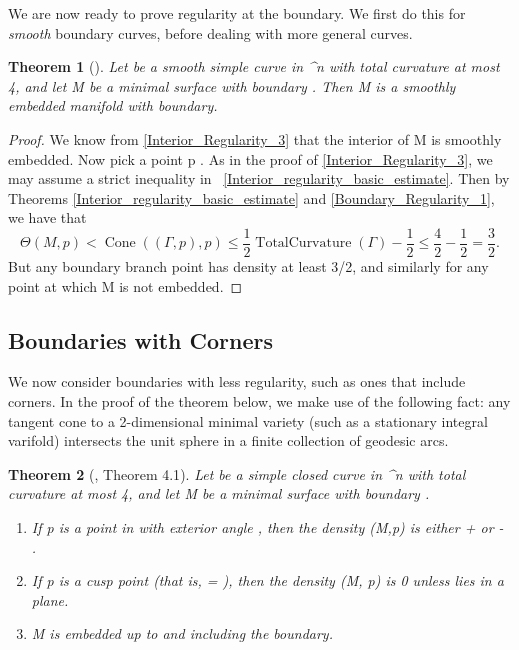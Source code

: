 \documentclass[a4paper, 11pt]{article}
\theoremstyle{plain}
\newtheorem{theorem}{Theorem}[section]
\theoremstyle{definition}
\theoremstyle{remark}
\numberwithin{equation}{subsection}
\def\({}
\def\){}
\def\pi{}
\begin{document}
We are now ready to prove regularity at the boundary. We first do this for \emph{smooth} boundary curves, before dealing with more general curves.

\begin{theorem}[{\cite[Theorem 3.2]{EWW02}}]
Let \(\Gamma\) be a smooth simple curve in \(^{n}\) with total curvature at most \(4\pi\), and let \(M\) be a minimal surface with boundary \(\Gamma\). Then \(M\) is a smoothly embedded manifold with boundary.
\end{theorem}

  
\begin{proof}
We know from \cref{Interior_Regularity_3} that the interior of \(M\) is smoothly embedded. Now pick a point \(p \in \Gamma\). As in the proof of  \cref{Interior_Regularity_3}, we may assume a strict inequality in \ \cref{Interior_regularity_basic_estimate}. Then by Theorems \ref{Interior_regularity_basic_estimate} and \ref{Boundary_Regularity_1}, we have that
\begin{equation}
\Theta(M,p) < \operatorname{Cone}((\Gamma, p), p) \leqslant \frac{1}{2\pi}\operatorname{TotalCurvature}(\Gamma) - \frac{1}{2} \leqslant \frac{4\pi}{2\pi} - \frac{1}{2} = \frac{3}{2}.
\end{equation}
But any boundary branch point has density at least \(3/2\), and similarly for any point at which \(M\) is not embedded.
\end{proof}



\subsection{Boundaries with Corners}

We now consider boundaries with less regularity, such as ones that include corners. In the proof of the theorem below, we make use of the following fact: any tangent cone to a \(2\)-dimensional minimal variety (such as a stationary integral varifold) intersects the unit sphere in a finite collection of geodesic arcs.

\begin{theorem}[{\cite{EWW02}, Theorem 4.1}]
\label{Boundary_Corners}
Let \(\Gamma\) be a simple closed curve in \(^{n}\) with total curvature at most \(4\pi\), and let \(M\) be a minimal surface with boundary \(\Gamma\).

\begin{enumerate}
\item[(i)] If \(p\) is a point in \(\Gamma\) with exterior angle \(\theta\), then the density \(\Theta(M,p)\) is either \( + \frac{\theta}{2\pi}\) or  \( - \frac{\theta}{2\pi}\).
\item[(ii)] If \(p\) is a cusp point (that is, \(\theta = \pi\)), then the density \(\Theta(M, p)\) is  \(0\) unless \(\Gamma\) lies in a plane.
\item[(iii)] \(M\) is embedded up to and including the boundary.
\end{enumerate}
\end{theorem}
\end{document}
